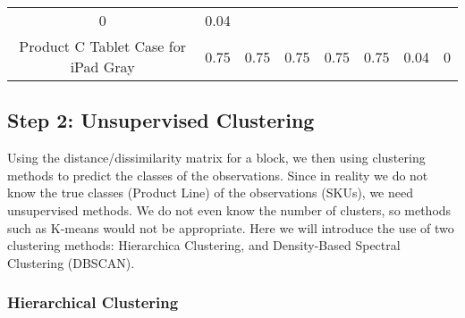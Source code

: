 \documentclass[]{article}
\begin{document}
\begin{longtable}[]{@{}ccllllll@{}}
\begin{minipage}[t]{0.05\columnwidth}
0\strut
\end{minipage} & \begin{minipage}[t]{0.05\columnwidth}\raggedright\strut
0.04\strut
\end{minipage}\tabularnewline
\begin{minipage}[t]{0.36\columnwidth}\centering\strut
Product C Tablet Case for iPad Gray\strut
\end{minipage} & \begin{minipage}[t]{0.05\columnwidth}\centering\strut
0.75\strut
\end{minipage} & \begin{minipage}[t]{0.05\columnwidth}\raggedright\strut
0.75\strut
\end{minipage} & \begin{minipage}[t]{0.05\columnwidth}\raggedright\strut
0.75\strut
\end{minipage} & \begin{minipage}[t]{0.05\columnwidth}\raggedright\strut
0.75\strut
\end{minipage} & \begin{minipage}[t]{0.05\columnwidth}\raggedright\strut
0.75\strut
\end{minipage} & \begin{minipage}[t]{0.05\columnwidth}\raggedright\strut
0.04\strut
\end{minipage} & \begin{minipage}[t]{0.05\columnwidth}\raggedright\strut
0\strut
\end{minipage}\tabularnewline
\bottomrule
\end{longtable}

\subsection{Step 2: Unsupervised
Clustering}\label{step-2-unsupervised-clustering}

Using the distance/dissimilarity matrix for a block, we then using
clustering methods to predict the classes of the observations. Since in
reality we do not know the true classes (Product Line) of the
observations (SKUs), we need unsupervised methods. We do not even know
the number of clusters, so methods such as K-means would not be
appropriate. Here we will introduce the use of two clustering methods:
Hierarchica Clustering, and Density-Based Spectral Clustering (DBSCAN).

\subsubsection{Hierarchical Clustering}\label{hierarchical-clustering}
\end{document}
